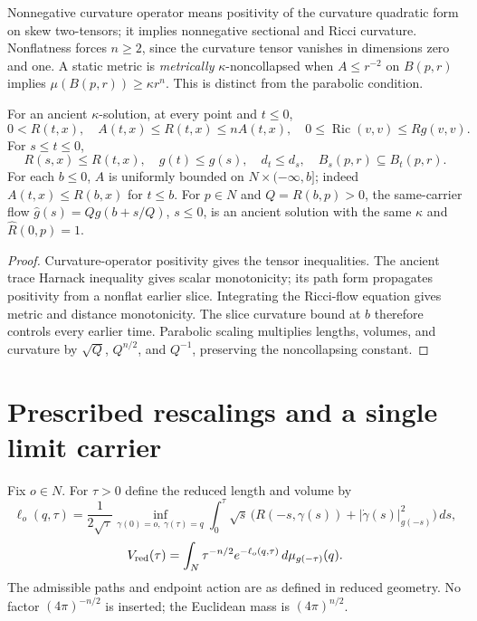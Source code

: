 Nonnegative curvature operator means positivity of the curvature
quadratic form on skew two-tensors; it implies nonnegative sectional
and Ricci curvature.  Nonflatness forces $n\geq2$, since the
curvature tensor vanishes in dimensions zero and one.
A static metric is \emph{metrically}
$\kappa$-noncollapsed when $A\leq r^{-2}$ on $B(p,r)$ implies
$\mu(B(p,r))\geq\kappa r^n$.  This is distinct from the parabolic condition.

\begin{theorem}
\label{thm:ancient-structure}
For an ancient $\kappa$-solution, at every point and $t\leq0$,
\[
 0<R(t,x),\quad A(t,x)\leq R(t,x)\leq nA(t,x),\quad
 0\leq\operatorname{Ric}(v,v)\leq Rg(v,v).
\]
For $s\leq t\leq0$,
\[
 R(s,x)\leq R(t,x),\quad g(t)\leq g(s),\quad d_t\leq d_s,\quad
 B_s(p,r)\subseteq B_t(p,r).
\]
For each $b\leq0$, $A$ is uniformly bounded on $N\times(-\infty,b]$;
indeed $A(t,x)\leq R(b,x)$ for $t\leq b$.
For $p\in N$ and $Q=R(b,p)>0$, the same-carrier flow
$\widehat g(s)=Qg(b+s/Q)$, $s\leq0$, is an ancient solution with the
same $\kappa$ and $\widehat R(0,p)=1$.
\end{theorem}
\begin{proof}
Curvature-operator positivity gives the tensor inequalities. The ancient trace
Harnack inequality gives scalar monotonicity; its path form propagates
positivity from a nonflat earlier slice. Integrating the Ricci-flow equation
gives metric and distance monotonicity. The slice curvature bound at $b$
therefore controls every earlier time. Parabolic scaling multiplies lengths,
volumes, and curvature by $\sqrt Q$, $Q^{n/2}$, and $Q^{-1}$, preserving the
noncollapsing constant.
\end{proof}

\section{Prescribed rescalings and a single limit carrier}

Fix $o\in N$.  For $\tau>0$ define the reduced length and volume by
\[
 \ell_o(q,\tau)=\frac1{2\sqrt\tau}
 \inf_{\gamma(0)=o,\ \gamma(\tau)=q}
 \int_0^\tau\sqrt s\,
       \bigl(R(-s,\gamma(s))+|\dot\gamma(s)|_{g(-s)}^2\bigr)\,ds ,
\]
\[
 V_{\rm red}(\tau)=
 \int_N\tau^{-n/2}e^{-\ell_o(q,\tau)}\,d\mu_{g(-\tau)}(q).
\]
The admissible paths and endpoint action are as defined in reduced
geometry.  No factor $(4\pi)^{-n/2}$ is inserted; the Euclidean mass
is $(4\pi)^{n/2}$.

